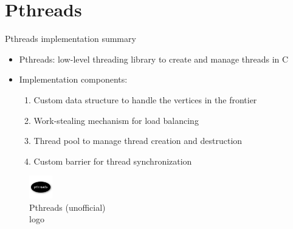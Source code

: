 \section{Pthreads}
\begin{frame}{Pthreads implementation summary}
\begin{itemize}
  \item<1-> Pthreads: low-level threading library to create and manage threads in C
  \item<2-> Implementation components:
  \begin{enumerate}
    \item<2-> Custom data structure to handle the vertices in the frontier
    \item<3-> Work-stealing mechanism for load balancing
    \item<4-> Thread pool to manage thread creation and destruction
    \item<5-> Custom barrier for thread synchronization
  \end{enumerate}
\end{itemize}
\begin{figure}
  \centering
  \includegraphics[height=1cm, trim={0 1cm 0 1cm},clip]{images/pthreads.png}
  \caption{Pthreads (unofficial)\\logo}
\end{figure}
\end{frame}
